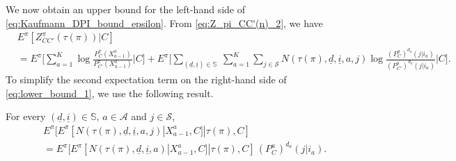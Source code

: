 We now obtain an upper bound for the left-hand side of \eqref{eq:Kaufmann_DPI_bound_epsilon}. From \eqref{eq:Z_pi_CC'(n)_2}, we have
\begingroup \allowdisplaybreaks\begin{align}
	&E^\pi[Z^\pi_{CC'}(\tau(\pi))|C]\nonumber\\
	&=E^\pi\bigg[\sum\limits_{a=1}^{K}\log\frac{P^\pi_C(X_{a-1}^a)}{P^\pi_{C'}(X_{a-1}^a)}\bigg\vert C\bigg]+E^\pi\bigg[\sum\limits_{(\underline{d},\underline{i})\in\mathbb{S}}~\sum\limits_{a=1}^{K}\sum\limits_{j\in\mathcal{S}}N(\tau(\pi),\underline{d},\underline{i},a,j)\log\frac{(P_C^{a})^{d_a}(j|i_a)}{(P_{C'}^{a})^{d_a}(j|i_a)}\bigg\vert C \bigg].\label{eq:lower_bound_1}
\end{align}\endgroup
To simplify the second expectation term on the right-hand side of \eqref{eq:lower_bound_1}, we use the following result.
\begin{lemma}\label{lem:relation_between_N(tau,d,i,j,a)_and_N(tau,d,i,a)}
	{\color{black} For every $(\underline{d},\underline{i})\in \mathbb{S}$, $a\in\mathcal{A}$ and $j\in \mathcal{S}$,}
	\begin{align}
		&E^\pi[E^\pi[N(\tau(\pi),\underline{d},\underline{i},a,j)|X_{a-1}^a,C]|\tau(\pi),C]\nonumber\\
		&=E^\pi[E^\pi[N(\tau(\pi),\underline{d},\underline{i},a)|X_{a-1}^a,C]|\tau(\pi),C]\,(P_C^a)^{d_a}(j|i_a).\label{eq:relation_between_N(tau,d,i,j,a)_and_N(tau,d,i,a)}
	\end{align}
\end{lemma}

